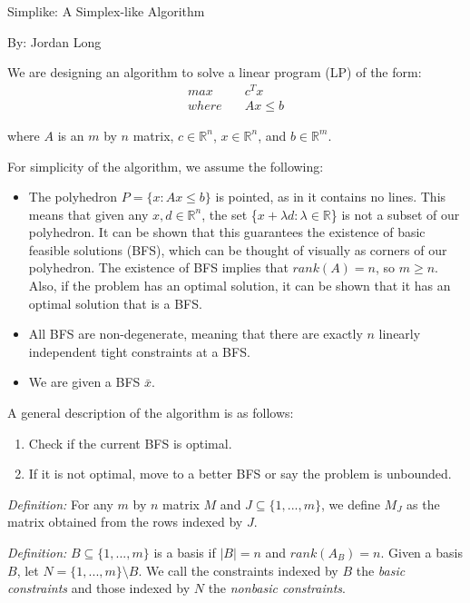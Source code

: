 \documentclass[12pt]{article}
\begin{document}
\begin{center}
\Large Simplike: A Simplex-like Algorithm
\end{center}
\hspace*{\fill} By: Jordan Long
\bigskip


We are designing an algorithm to solve a linear program (LP) of the form:
\begin{align*}
 max \quad &c^Tx\\ 
 where \quad &Ax \leq b
\end{align*}
 
where $A$ is an $m$ by $n$ matrix, $c \in \mathbb{R}^n$, $x \in \mathbb{R}^n$, and $b \in \mathbb{R}^m$. 
 
\bigskip
For simplicity of the algorithm, we assume the following:
 
\begin{itemize}
\item The polyhedron $P = \{x : Ax \leq b\}$ is pointed, as in it contains no lines. This means that given any $x, d \in \mathbb{R}^n$, the set \{$x + \lambda d : \lambda \in \mathbb{R}$\} is not a subset of our polyhedron. It can be shown that this guarantees the existence of basic feasible solutions (BFS), which can be thought of visually as corners of our polyhedron. The existence of BFS implies that $rank(A) = n$, so $m \geq n$. Also, if the problem has an optimal solution, it can be shown that it has an optimal solution that is a BFS.
 \item All BFS are non-degenerate, meaning that there are exactly $n$ linearly independent tight constraints at a BFS.
 \item We are given a BFS $\bar{x}$.
 \end{itemize}

A general description of the algorithm is as follows:
\begin{enumerate}
\item Check if the current BFS is optimal.
\item If it is not optimal, move to a better BFS or say the problem is unbounded.
\end{enumerate}

\noindent \textit{Definition:} For any $m$ by $n$ matrix $M$ and $J \subseteq \{1,...,m\}$, we define $M_J$ as the matrix obtained from the rows indexed by $J$.
\bigskip

\noindent \textit{Definition:} $B \subseteq \{1,...,m\}$ is a basis if $|B| = n$ and $rank(A_B) = n$. Given a basis $B$, let $N = \{1,...,m\} \setminus B$. We call the constraints indexed by $B$ the \textit{basic constraints} and those indexed by $N$ the \textit{nonbasic constraints}.
\bigskip
\end{document}
